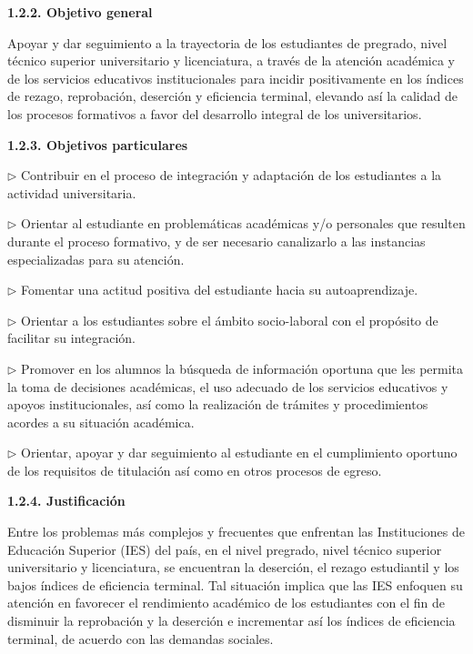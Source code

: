 \medskip
{\bfseries 1.2.2. Objetivo general}

Apoyar y dar seguimiento a la trayectoria de los estudiantes de pregrado,
nivel técnico superior universitario y licenciatura, a través de la
atención académica y de los servicios educativos institucionales para
incidir positivamente en los índices de rezago, reprobación, deserción y
eficiencia terminal, elevando así la calidad de los procesos formativos a
favor del desarrollo integral de los universitarios.


\medskip
{\bfseries 1.2.3. Objetivos particulares}

\begin{Obs}
\item[$\rhd$] Contribuir en el proceso de integración y adaptación de los estudiantes a
la actividad universitaria.
\item[$\rhd$] Orientar al estudiante en problemáticas académicas y\slash{}o personales que
resulten durante el proceso formativo, y de ser necesario canalizarlo a las
instancias especializadas para su atención.
\item[$\rhd$] Fomentar una actitud positiva del estudiante hacia su autoaprendizaje.
\item[$\rhd$] Orientar a los estudiantes sobre el ámbito socio-laboral con el propósito
de facilitar su integración.
\item[$\rhd$] Promover en los alumnos la búsqueda de información oportuna que les
permita la toma de decisiones académicas, el uso adecuado de los servicios
educativos y apoyos institucionales, así como la realización de trámites y
procedimientos acordes a su situación académica.
\item[$\rhd$] Orientar, apoyar y dar seguimiento al estudiante en el cumplimiento
oportuno de los requisitos de titulación así como en otros procesos de
egreso.
\end{Obs}

\medskip
{\bfseries 1.2.4. Justificación}

Entre los problemas más complejos y frecuentes que enfrentan las
Instituciones de Educación Superior (IES) del país, en el nivel pregrado,
nivel técnico superior universitario y licenciatura, se encuentran la
deserción, el rezago estudiantil y los bajos índices de eficiencia
terminal. Tal situación implica que las IES enfoquen su atención en
favorecer el rendimiento académico de los estudiantes con el fin de
disminuir la reprobación y la deserción e incrementar así los índices de
eficiencia terminal, de acuerdo con las demandas sociales.

